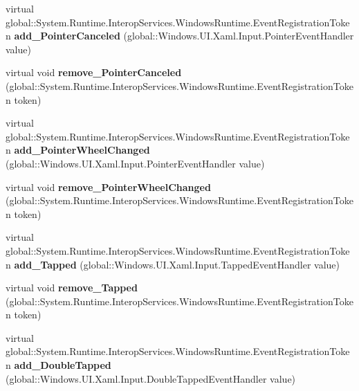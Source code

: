 \begin{DoxyCompactItemize}
virtual global\+::\+System.\+Runtime.\+Interop\+Services.\+Windows\+Runtime.\+Event\+Registration\+Token {\bfseries add\+\_\+\+Pointer\+Canceled} (global\+::\+Windows.\+U\+I.\+Xaml.\+Input.\+Pointer\+Event\+Handler value)
\item 
\mbox{\label{class_windows_1_1_u_i_1_1_xaml_1_1_u_i_element_a2ce3ea526a5e9942687b9fe640cbdb26}} 
virtual void {\bfseries remove\+\_\+\+Pointer\+Canceled} (global\+::\+System.\+Runtime.\+Interop\+Services.\+Windows\+Runtime.\+Event\+Registration\+Token token)
\item 
\mbox{\label{class_windows_1_1_u_i_1_1_xaml_1_1_u_i_element_a789daf5519a2893ca5d46308010e2bae}} 
virtual global\+::\+System.\+Runtime.\+Interop\+Services.\+Windows\+Runtime.\+Event\+Registration\+Token {\bfseries add\+\_\+\+Pointer\+Wheel\+Changed} (global\+::\+Windows.\+U\+I.\+Xaml.\+Input.\+Pointer\+Event\+Handler value)
\item 
\mbox{\label{class_windows_1_1_u_i_1_1_xaml_1_1_u_i_element_ac3ff4695ca9eb06d618cbf67509cf594}} 
virtual void {\bfseries remove\+\_\+\+Pointer\+Wheel\+Changed} (global\+::\+System.\+Runtime.\+Interop\+Services.\+Windows\+Runtime.\+Event\+Registration\+Token token)
\item 
\mbox{\label{class_windows_1_1_u_i_1_1_xaml_1_1_u_i_element_a424707fb793f3cb0d3d9c1a1d642c7e1}} 
virtual global\+::\+System.\+Runtime.\+Interop\+Services.\+Windows\+Runtime.\+Event\+Registration\+Token {\bfseries add\+\_\+\+Tapped} (global\+::\+Windows.\+U\+I.\+Xaml.\+Input.\+Tapped\+Event\+Handler value)
\item 
\mbox{\label{class_windows_1_1_u_i_1_1_xaml_1_1_u_i_element_a2e2bb189943aceb74962211a295014c7}} 
virtual void {\bfseries remove\+\_\+\+Tapped} (global\+::\+System.\+Runtime.\+Interop\+Services.\+Windows\+Runtime.\+Event\+Registration\+Token token)
\item 
\mbox{\label{class_windows_1_1_u_i_1_1_xaml_1_1_u_i_element_a5dae62e559d69ce1b422ccd06618f671}} 
virtual global\+::\+System.\+Runtime.\+Interop\+Services.\+Windows\+Runtime.\+Event\+Registration\+Token {\bfseries add\+\_\+\+Double\+Tapped} (global\+::\+Windows.\+U\+I.\+Xaml.\+Input.\+Double\+Tapped\+Event\+Handler value)

\end{DoxyCompactItemize}

